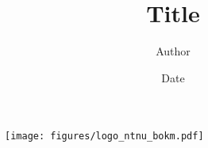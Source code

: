 \documentclass[11pt, a4paper, norsk]{article}
\title{Title}
\author{Author}
\date{Date}
\begin{document}
\maketitle

\vfill
\begin{figure}
    \centering
    \texttt{[image: figures/logo\_ntnu\_bokm.pdf]}
    \label{fig:logo}
\end{figure}
\thispagestyle{empty}
\newpage
\tableofcontents
\newpage



\newpage
{}
\printbibliography{}%
\label{sec:bibliography}
\end{document}
